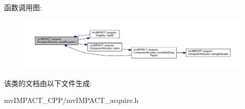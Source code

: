 函数调用图\+:
\nopagebreak
\begin{figure}[H]
\begin{center}
\leavevmode
\includegraphics[width=350pt]{classmv_i_m_p_a_c_t_1_1acquire_1_1_exception_factory_a70b2f93291f2269c04ef2092c7872527_cgraph}
\end{center}
\end{figure}




该类的文档由以下文件生成\+:\begin{DoxyCompactItemize}
\item 
mv\+I\+M\+P\+A\+C\+T\+\_\+\+C\+P\+P/mv\+I\+M\+P\+A\+C\+T\+\_\+acquire.\+h\end{DoxyCompactItemize}
